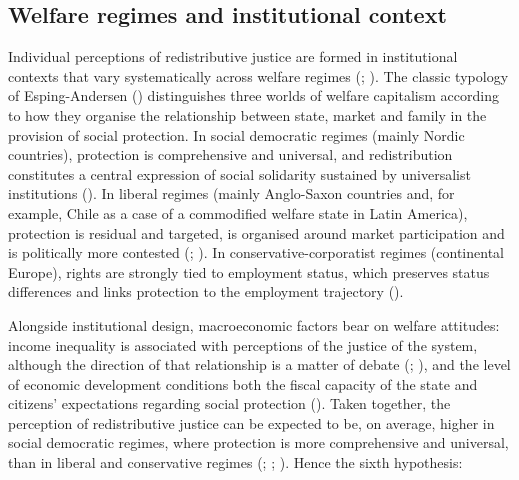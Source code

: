 \documentclass[
  12pt,
]{article}
\begin{document}
\subsection{Welfare regimes and institutional
context}\label{welfare-regimes-and-institutional-context}

Individual perceptions of redistributive justice are formed in
institutional contexts that vary systematically across welfare regimes
(;
). The
classic typology of Esping-Andersen
() distinguishes three
worlds of welfare capitalism according to how they organise the
relationship between state, market and family in the provision of social
protection. In social democratic regimes (mainly Nordic countries),
protection is comprehensive and universal, and redistribution
constitutes a central expression of social solidarity sustained by
universalist institutions (). In liberal regimes (mainly Anglo-Saxon countries and, for
example, Chile as a case of a commodified welfare state in Latin
America), protection is residual and targeted, is organised around
market participation and is politically more contested
(;
). In
conservative-corporatist regimes (continental Europe), rights are
strongly tied to employment status, which preserves status differences
and links protection to the employment trajectory
().

Alongside institutional design, macroeconomic factors bear on welfare
attitudes: income inequality is associated with perceptions of the
justice of the system, although the direction of that relationship is a
matter of debate (;
), and
the level of economic development conditions both the fiscal capacity of
the state and citizens' expectations regarding social protection
(). Taken
together, the perception of redistributive justice can be expected to
be, on average, higher in social democratic regimes, where protection is
more comprehensive and universal, than in liberal and conservative
regimes (;
;
). Hence the sixth
hypothesis:
\end{document}
